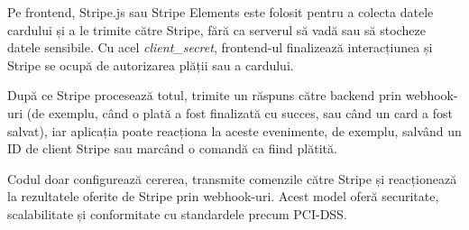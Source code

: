 Pe frontend, Stripe.js sau Stripe Elements este folosit pentru a colecta datele cardului și a le trimite către Stripe, fără ca serverul să vadă sau să stocheze datele sensibile. Cu acel \textit{client\_secret}, frontend-ul finalizează interacțiunea și Stripe se ocupă de autorizarea plății sau a cardului. \parencite{stripe}

După ce Stripe procesează totul, trimite un răspuns către backend prin webhook-uri (de exemplu, când o plată a fost finalizată cu succes, sau când un card a fost salvat), iar aplicația poate reacționa la aceste evenimente, de exemplu, salvând un ID de client Stripe sau marcând o comandă ca fiind plătită. \parencite{stripe}

Codul doar configurează cererea, transmite comenzile către Stripe și reacționează la rezultatele oferite de Stripe prin webhook-uri. Acest model oferă securitate, scalabilitate și conformitate cu standardele precum PCI-DSS.